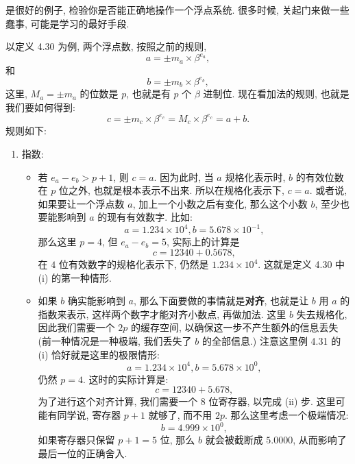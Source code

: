\documentclass[a4paper]{ctexart}
\begin{document}
 是很好的例子,
检验你是否能正确地操作一个浮点系统. 很多时候, 关起门来做一些蠢事,
可能是学习的最好手段.

以定义 4.30 为例, 两个浮点数, 按照之前的规则,
$$
a = \pm m_a \times \beta^{e_a},  
$$
和
$$
b = \pm m_b \times \beta^{e_b},  
$$
这里, $M_a = \pm m_a$ 的位数是 $p$, 也就是有 $p$ 个 $\beta$ 进制位.
现在看加法的规则, 也就是我们要如何得到:
$$
c = \pm m_c \times \beta^{e_c} = M_c \times \beta^{e_c} = a + b.
$$
规则如下:
\begin{enumerate}
\item 指数:
  \begin{itemize}
  \item 若 $e_a - e_b > p + 1$, 则 $c = a$. 因为此时,
    当 $a$ 规格化表示时, $b$ 的有效位数在 $p$ 位之外,
    也就是根本表示不出来. 所以在规格化表示下, $c = a$.
    或者说, 如果要让一个浮点数 $a$, 加上一个小数之后有变化,
    那么这个小数 $b$, 至少也要能影响到 $a$ 的现有有效数字.
    比如:
    $$
    a = 1.234 \times 10^4, b = 5.678 \times 10^{-1},
    $$
    那么这里 $p = 4$, 但 $e_a - e_b = 5$, 实际上的计算是
    $$
    c = 12340 + 0.5678, 
    $$
    在 $4$ 位有效数字的规格化表示下, 仍然是 $1.234 \times 10^4$.
    这就是定义 4.30 中 (i) 的第一种情形.  
  \item 如果 $b$ 确实能影响到 $a$, 那么下面要做的事情就是{\bf 对齐},
    也就是让 $b$ 用 $a$ 的指数来表示, 这样两个数字才能对齐小数点,
    再做加法. 这里 $b$ 失去规格化, 因此我们需要一个 $2 p$ 的缓存空间,
    以确保这一步不产生额外的信息丢失 (前一种情况是一种极端, 我们丢失了 $b$ 的全部信息.)
    注意这里例 4.31 的 (i) 恰好就是这里的极限情形:
    $$
    a = 1.234 \times 10^4, b = 5.678 \times 10^{0},
    $$
    仍然 $p = 4$. 这时的实际计算是:
    $$
    c = 12340 + 5.678, 
    $$
    为了进行这个对齐计算, 我们需要一个 $8$ 位寄存器, 以完成 (ii)
    步. 
    这里可能有同学说, 寄存器 $p + 1$ 就够了, 而不用 $2p$. 
    那么这里考虑一个极端情况:
    $$
    b = 4.999 \times 10^{0},
    $$
    如果寄存器只保留 $p + 1 = 5$ 位, 
    那么 $b$ 就会被截断成 $5.0000$, 从而影响了最后一位的正确舍入.
  

\end{itemize}
\end{enumerate}
\end{document}

